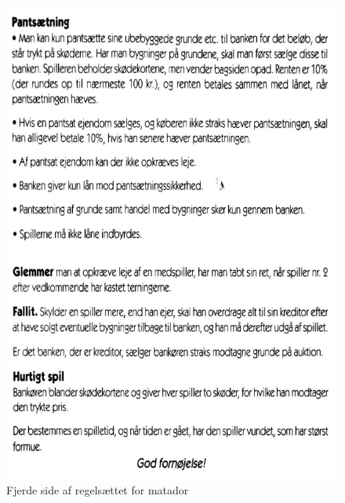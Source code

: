 \begin{flushleft}
\begin{figure}[H]
    \includegraphics[width=14cm]{Report/figures/MatadorRegler4.PNG}
    \caption{Fjerde side af regelsættet for matador}
    \label{MatadorRules4}
    
\end{figure}
\label{endOfDoc}
\end{flushleft}

